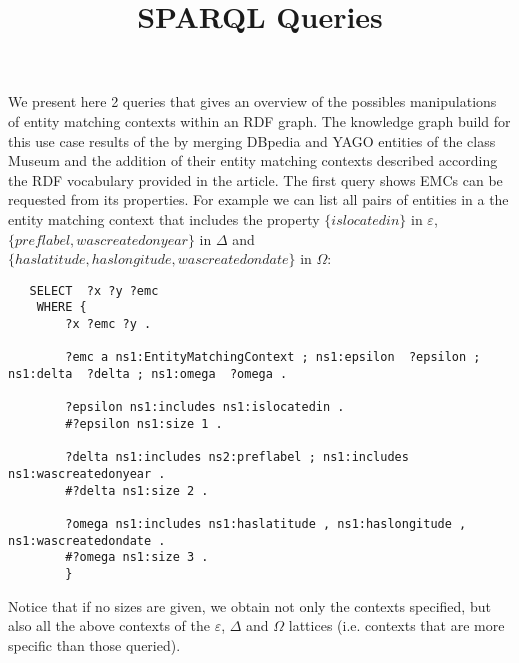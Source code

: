 \documentclass[runningheads]{llncs}
\begin{document}
%
\title{SPARQL Queries}
%
%
%
\maketitle              %
%

%
%
%

We present here 2 queries that gives an overview of the possibles manipulations of entity matching contexts within an RDF graph. 
The knowledge graph build for this use case results of the by merging DBpedia and YAGO entities of the class Museum and the addition of their entity matching contexts described according the RDF vocabulary provided in the article.
The first query shows EMCs can be requested from its properties.
For example we can list all pairs of entities in a the entity matching context that includes the property $\{islocatedin\}$ in $\varepsilon$, $\{preflabel,wascreatedonyear\}$ in $\Delta$ and $\{haslatitude,haslongitude,wascreatedondate\}$ in $\Omega$: 

\begin{lstlisting}
   SELECT  ?x ?y ?emc
    WHERE {
        ?x ?emc ?y .
        
        ?emc a ns1:EntityMatchingContext ; ns1:epsilon  ?epsilon ; ns1:delta  ?delta ; ns1:omega  ?omega .

        ?epsilon ns1:includes ns1:islocatedin .
        #?epsilon ns1:size 1 .

        ?delta ns1:includes ns2:preflabel ; ns1:includes ns1:wascreatedonyear .
        #?delta ns1:size 2 .

        ?omega ns1:includes ns1:haslatitude , ns1:haslongitude , ns1:wascreatedondate .
        #?omega ns1:size 3 .
        }
\end{lstlisting}
Notice that if no sizes are given, we obtain not only the contexts specified, but also all the above contexts of the $\varepsilon$, $\Delta$ and $\Omega$ lattices (i.e. contexts that are more specific than those queried).
\end{document}
